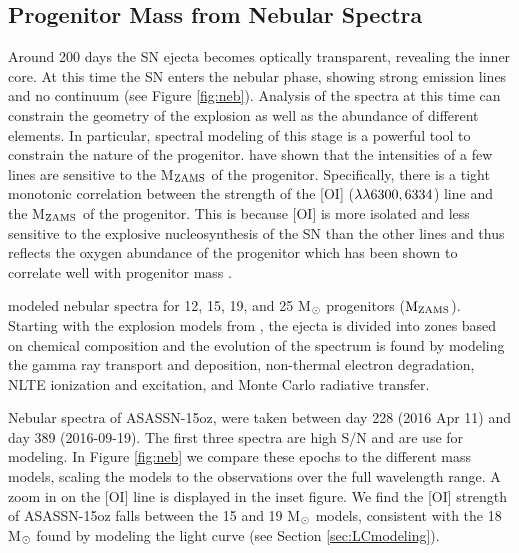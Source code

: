 \documentclass[a4paper,fleqn,usenatbib]{mnras}
\begin{document}
\subsection{Progenitor Mass from Nebular Spectra} \label{sec:nebular}
Around 200 days the SN ejecta becomes optically transparent, revealing the inner core. 
At this time the SN enters the nebular phase, showing strong emission lines and no continuum (see Figure \ref{fig:neb}).
Analysis of the spectra at this time can constrain the geometry of the explosion as well as the abundance of different elements.
In particular, spectral modeling of this stage is a powerful tool to constrain the nature of the progenitor.
\citet{2012jerkstrand,2014jerkstrand} have shown that the intensities of a few lines are sensitive to the M$\rm{_{ZAMS}}$ of the progenitor.
Specifically, there is a tight monotonic correlation between the strength of the [OI] ($\rm{\lambda\lambda6300, 6334}$) line and the M$\rm{_{ZAMS}}$ of the progenitor.
This is because [OI] is more isolated and less sensitive to the explosive nucleosynthesis of the SN than the other lines and thus reflects the oxygen abundance of the progenitor which has been shown to correlate well with progenitor mass \citep{1995woosley}.

\citet{2014jerkstrand} modeled nebular spectra for 12, 15, 19, and 25 M$\rm{_{\odot}}$ progenitors ($\rm{M_{ZAMS}}$).
Starting with the explosion models from \citet{2007woosley}, the ejecta is divided into zones based on chemical composition and the evolution of the spectrum is found by modeling the gamma ray transport and deposition, non-thermal electron degradation, NLTE ionization and excitation, and Monte Carlo radiative transfer.

Nebular spectra of ASASSN-15oz, were taken between day 228 (2016 Apr 11) and  day 389 (2016-09-19).
The first three spectra are high S/N and are use for modeling.
In Figure \ref{fig:neb} we compare these epochs to the different mass models, scaling the models to the observations over the full wavelength range. 
A zoom in on the [OI] line is displayed in the inset figure. 
We find the [OI] strength of ASASSN-15oz falls between the 15 and 19 M$\rm{_\odot}$ models, consistent with the 18 M$\rm{_{\odot}}$ found by modeling the light curve (see Section \ref{sec:LCmodeling}).
\end{document}
